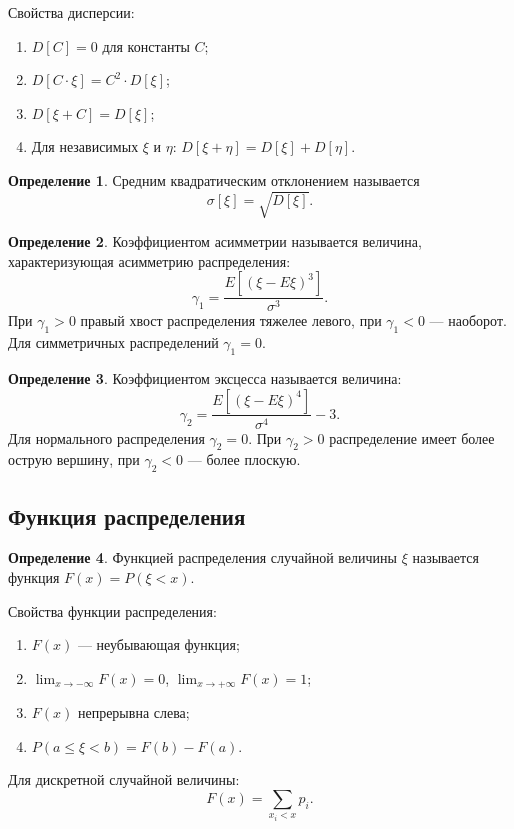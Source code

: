 \documentclass[a4paper]{article}
\theoremstyle{definition}
\newtheorem{definition}{Определение}[subsection]
\begin{document}
Свойства дисперсии:
\begin{enumerate}
    \item $D[C] = 0$ для константы $C$;
    \item $D[C \cdot \xi] = C^2 \cdot D[\xi]$;
    \item $D[\xi + C] = D[\xi]$;
    \item Для независимых $\xi$ и $\eta$: $D[\xi + \eta] = D[\xi] + D[\eta]$.
\end{enumerate}

\begin{definition}
Средним квадратическим отклонением называется
\begin{equation}
    \sigma[\xi] = \sqrt{D[\xi]}. \tag{16}
\end{equation}
\end{definition}

\begin{definition}
Коэффициентом асимметрии называется величина, характеризующая асимметрию распределения:
\begin{equation}
    \gamma_1 = \frac{E[(\xi - E\xi)^3]}{\sigma^3}. \tag{17}
\end{equation}
При $\gamma_1 > 0$ правый хвост распределения тяжелее левого, при $\gamma_1 < 0$ — наоборот. Для симметричных распределений $\gamma_1 = 0$.
\end{definition}

\begin{definition}
Коэффициентом эксцесса называется величина:
\begin{equation}
    \gamma_2 = \frac{E[(\xi - E\xi)^4]}{\sigma^4} - 3. \tag{18}
\end{equation}
Для нормального распределения $\gamma_2 = 0$. При $\gamma_2 > 0$ распределение имеет более острую вершину, при $\gamma_2 < 0$ — более плоскую.
\end{definition}

\subsection{Функция распределения}

\begin{definition}
Функцией распределения случайной величины $\xi$ называется функция $F(x) = P(\xi < x)$.
\end{definition}

Свойства функции распределения:
\begin{enumerate}
    \item $F(x)$ — неубывающая функция;
    \item $\lim_{x \to -\infty} F(x) = 0$, $\lim_{x \to +\infty} F(x) = 1$;
    \item $F(x)$ непрерывна слева;
    \item $P(a \le \xi < b) = F(b) - F(a)$.
\end{enumerate}
Для дискретной случайной величины:
\begin{equation}
    F(x) = \sum_{x_i < x} p_i. \tag{19}
\end{equation}
\end{document}
